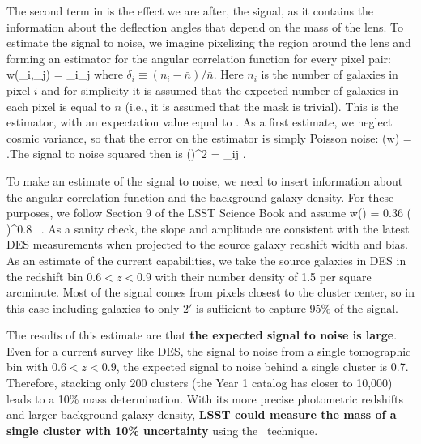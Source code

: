 The second term in  is the effect we are after, the signal,
as it contains the information about the deflection angles that
depend on the mass of the lens. To estimate the signal to noise, we
imagine pixelizing the region around the lens and forming an
estimator for the angular correlation function for every pixel pair:
\be \hat w(\vec\theta_i,\vec\theta_j) = \delta_i\delta_j \ee where
$\delta_i\equiv (n_i-\bar n)/\bar n$. Here $n_i$ is the number of
galaxies in pixel $i$ and for simplicity it is assumed that the
expected number of galaxies in each pixel is equal to $n$ (i.e., it
is assumed that the mask is trivial). This is the
\citet{1993ApJ...412...64L} estimator, with an expectation value equal to
.  As a first estimate, we neglect cosmic variance, so
that the error on the estimator is simply Poisson noise: (\hat w) =  .\ee The signal to noise squared
then is \be \left(\right)^2 = \sum_{ij}
 .\ee


To make an estimate of the signal to noise, we need to insert information about the angular correlation function and the background galaxy density.
For these purposes, we follow Section 9 of the LSST Science Book and assume
\be
w(\theta) = 0.36 \left(  \right)^{0.8} \, .
\ee
As a sanity check, the slope and amplitude are consistent with the latest DES measurements \citep{Elvin-Poole:2017xsf} when projected to the source galaxy redshift width and bias. As an estimate of the current capabilities, we take the source galaxies in DES in the redshift bin $0.6<z<0.9$ with their number density of 1.5 per square arcminute.
Most of the signal comes from pixels closest to the cluster center, so in this case including galaxies to only $2'$ is sufficient
to capture 95\% of the signal. 


The results of this estimate are that {\bf the expected signal to noise is large}. Even for a current survey like DES, the signal to noise from a single tomographic bin with $0.6<z<0.9$, the expected signal to noise behind a single cluster is 0.7. Therefore, stacking only 200 clusters (the Year 1 catalog has closer to 10,000) leads to a 10\% mass determination. With its more precise photometric redshifts and larger background galaxy density, {\bf LSST could measure the mass of a single cluster with 10\% uncertainty} using the \atf\ technique.

